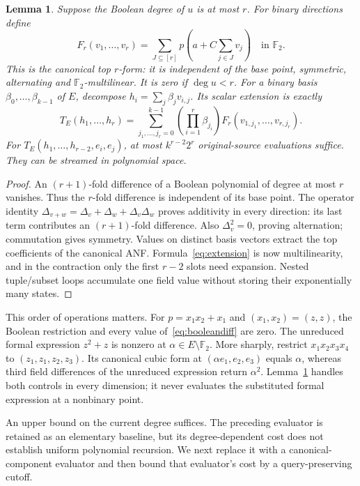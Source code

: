 \documentclass[11pt]{article}
\newtheorem{lemma}[theorem]{Lemma}
\theoremstyle{remark}\newtheorem{remark}[theorem]{Remark}
\newcommand{\F}{\mathbb F}
\begin{document}
\begin{lemma}\label{lem:boolean}
Suppose the Boolean degree of $u$ is at most $r$. For binary directions define
\begin{equation}\label{eq:booleandiff}
 F_r(v_1,\ldots,v_r)=\sum_{J\subseteq[r]}p\left(a+C\sum_{j\in J}v_j\right)\quad\text{in }\F_2.
\end{equation}
This is the canonical top $r$-form: it is independent of the base point, symmetric, alternating and $\F_2$-multilinear. It is zero if $\deg u<r$. For a binary basis $\beta_0,\ldots,\beta_{k-1}$ of $E$, decompose $h_i=\sum_j\beta_jv_{i,j}$. Its scalar extension is exactly
\begin{equation}\label{eq:extension}
 T_E(h_1,\ldots,h_r)=
 \sum_{j_1,\ldots,j_r=0}^{k-1}
 \left(\prod_{i=1}^r\beta_{j_i}\right)F_r(v_{1,j_1},\ldots,v_{r,j_r}).
\end{equation}
For $T_E(h_1,\ldots,h_{r-2},e_i,e_j)$, at most $k^{r-2}2^r$ original-source evaluations suffice. They can be streamed in polynomial space.
\end{lemma}
\begin{proof}
An $(r+1)$-fold difference of a Boolean polynomial of degree at most $r$ vanishes. Thus the $r$-fold difference is independent of its base point. The operator identity $\Delta_{v+w}=\Delta_v+\Delta_w+\Delta_v\Delta_w$ proves additivity in every direction: its last term contributes an $(r+1)$-fold difference. Also $\Delta_v^2=0$, proving alternation; commutation gives symmetry. Values on distinct basis vectors extract the top coefficients of the canonical ANF. Formula~\eqref{eq:extension} is now multilinearity, and in the contraction only the first $r-2$ slots need expansion. Nested tuple/subset loops accumulate one field value without storing their exponentially many states.
\end{proof}

This order of operations matters. For $p=x_1x_2+x_1$ and $(x_1,x_2)=(z,z)$, the Boolean restriction and every value of~\eqref{eq:booleandiff} are zero. The unreduced formal expression $z^2+z$ is nonzero at $\alpha\in E\setminus\F_2$. More sharply, restrict $x_1x_2x_3x_4$ to $(z_1,z_1,z_2,z_3)$. Its canonical cubic form at $(\alpha e_1,e_2,e_3)$ equals $\alpha$, whereas third field differences of the unreduced expression return $\alpha^2$. Lemma~\ref{lem:boolean} handles both controls in every dimension; it never evaluates the substituted formal expression at a nonbinary point.

An upper bound on the current degree suffices. The preceding evaluator is retained as an elementary baseline, but its degree-dependent cost does not establish uniform polynomial recursion. We next replace it with a canonical-component evaluator and then bound that evaluator's cost by a query-preserving cutoff.
\end{document}

